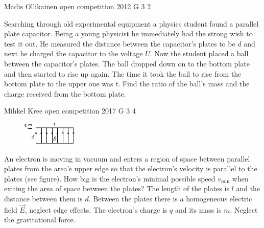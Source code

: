 \documentclass[11pt]{article}
\begin{document}
{Madis Ollikainen} %
{open competition} %
{2012} %
{G 3} %
{2} %
{

\ifEngStatement
Searching through old experimental equipment a physics student found a parallel plate capacitor. Being a young physicist he immediately had the strong wish to test it out. He measured the distance between the capacitor’s plates to be $d$ and next he charged the capacitor to the voltage $U$. Now the student placed a ball between the capacitor’s plates. The ball dropped down on to the bottom plate and then started to rise up again. The time it took the ball to rise from the bottom plate to the upper one was $t$. Find the ratio of the ball’s mass and the charge received from the bottom plate.
\fi
}

{Mihkel Kree} %
{open competition} %
{2017} %
{G 3} %
{4} %
{

\ifEngStatement
\begin{figure}
	\vspace{-10pt}
	\hspace{-10pt}
	\includegraphics[width=\linewidth]{2017-lahg-03-elJoonisMK}
\end{figure}
An electron is moving in vacuum and enters a region of space between parallel plates from the area’s upper edge so that the electron’s velocity is parallel to the plates (see figure). How big is the electron’s minimal possible speed $v_\mathrm{min}$ when exiting the area of space between the plates? The length of the plates is $l$ and the distance between them is $d$. Between the plates there is a homogeneous electric field $\vec{E}$, neglect edge effects. The electron’s charge is $q$ and its mass is $m$. Neglect the gravitational force.
\fi
}
\end{document}
